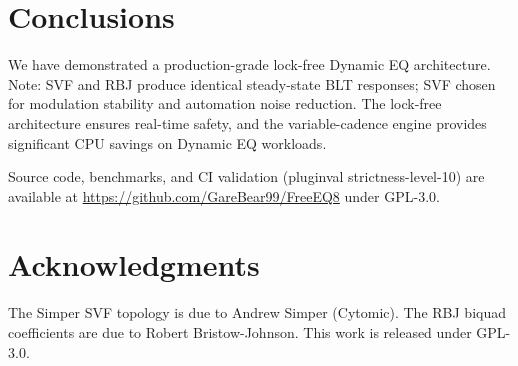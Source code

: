 \documentclass[twoside,a4paper]{article}
\begin{document}
\section{Conclusions}

We have demonstrated a production-grade lock-free Dynamic EQ architecture. Note: SVF and RBJ produce identical steady-state BLT responses; SVF chosen for modulation stability and automation noise reduction. The lock-free architecture ensures real-time safety, and the variable-cadence engine provides significant CPU savings on Dynamic EQ workloads.

Source code, benchmarks, and CI validation (pluginval strictness-level-10) are available at \url{https://github.com/GareBear99/FreeEQ8} under GPL-3.0.

\section{Acknowledgments}

The Simper SVF topology is due to Andrew Simper (Cytomic). The RBJ biquad coefficients are due to Robert Bristow-Johnson. This work is released under GPL-3.0.
\end{document}
